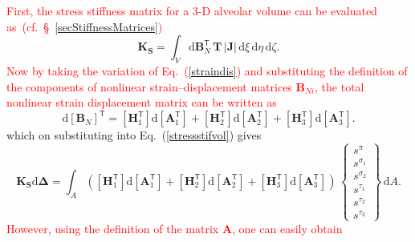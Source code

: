 \textcolor{red}{First, the stress stiffness matrix for a 3-D alveolar volume can be evaluated as~(cf.~\S~\ref{secStiffnessMatrices})}
\begin{equation}
\mathbf{K}_\mathbf{S} = \int_{V}  \mathrm{d} \mathbf{B}_N^{\mathsf{T}} \, \mathbf{T} \, |\mathbf{J}|  \, \mathrm{d} \xi \,  \mathrm{d} \eta \, \mathrm{d} \zeta.
\label{stressstifvol}
\end{equation}
\textcolor{red}{Now by taking the variation of Eq.~(\ref{straindis}) and substituting the definition of the components of nonlinear strain--displacement matrices $\mathbf{B}_{Ni}$, the total nonlinear strain displacement matrix can be written as}
\begin{equation}
\mathrm{d}[\mathbf{B}_N]^{\mathsf{T}} = [\mathbf{H}_1^{\mathsf{T}}] \mathrm{d} [\mathbf{A}_1^{\mathsf{T}}] + [\mathbf{H}_2^{\mathsf{T}}] \mathrm{d} [\mathbf{A}_2^{\mathsf{T}}] + [\mathbf{H}_3^{\mathsf{T}}] \mathrm{d} [\mathbf{A}_3^{\mathsf{T}}].
\end{equation}
which on substituting into Eq.~(\ref{stressstifvol}) gives 
\begin{equation}
\mathbf{K_\mathbf{S}} \mathrm{d} \boldsymbol{\Delta} = \int_A \left(
[\mathbf{H}_1^{\mathsf{T}}] \mathrm{d} [\mathbf{A}_1^{\mathsf{T}}] + [\mathbf{H}_2^{\mathsf{T}}] \mathrm{d} [\mathbf{A}_2^{\mathsf{T}}] + [\mathbf{H}_3^{\mathsf{T}}] \mathrm{d} [\mathbf{A}_3^{\mathsf{T}}] \right) \, \begin{Bmatrix} s^{\pi} \\ s^{\sigma_1} \\ s^{\sigma_2}  \\ s^{\tau_1} \\ s^{\tau_2} \\ s^{\tau_3} \end{Bmatrix} \, \mathrm{d} A.
\label{eq:Ks_3d}
\end{equation}
\textcolor{red}{However, using the definition of the matrix $\mathbf{A}$, one can easily obtain} 
